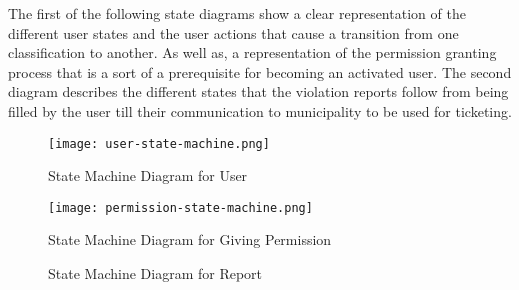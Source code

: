 The first of the following state diagrams show a clear representation of the different user states and the user actions that cause a transition from one classification to another. As well as, a representation of the permission granting process that is a sort of a prerequisite for becoming an activated user. The second diagram describes the different states that the violation reports follow from being filled by the user till their communication to municipality to be used for ticketing.


\begin{figure}[H]
\caption{State Machine Diagram for User}
\label{fig:ms-user}
\centering
\texttt{[image: user-state-machine.png]}
\end{figure}

\begin{figure}[H]
\caption{State Machine Diagram for Giving Permission}
\label{fig:ms-giving-permission}
\centering
\texttt{[image: permission-state-machine.png]}
\end{figure}

\begin{figure}[H]
\caption{State Machine Diagram for Report}
\label{fig:ms-reportstm}
\centering

\end{figure}